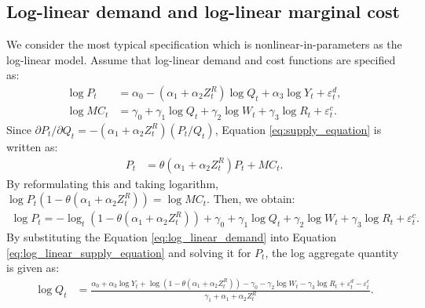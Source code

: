 \documentclass[11pt, a4paper]{article}
\begin{document}
\subsection{Log-linear demand and log-linear marginal cost}
We consider the most typical specification which is nonlinear-in-parameters as the log-linear model.
Assume that log-linear demand and cost functions are specified as:
\begin{align}
    \log P_{t} &= \alpha_0 - (\alpha_1 + \alpha_2 Z^{R}_{t}) \log Q_t + \alpha_3 \log Y_t + \varepsilon^{d}_{t},\label{eq:log_linear_demand}\\
    \log MC_t &= \gamma_0 + \gamma_1 \log Q_t +  \gamma_2 \log W_{t} + \gamma_3 \log R_t + \varepsilon^{c}_{t}.\label{eq:log_linear_marginal_cost}
\end{align}
Since $\partial P_t/\partial Q_t = - (\alpha_1 + \alpha_2 Z_{t}^R) (P_t/Q_t) $, Equation \eqref{eq:supply_equation} is written as:
\begin{align}
    P_t &= \theta (\alpha_1 + \alpha_2 Z^{R}_{t}) P_t + MC_t.\label{eq:log_linear_supply_equation_direct}
\end{align}
By reformulating this and taking logarithm, $\log P_t(1 -\theta (\alpha_1 + \alpha_2 Z^{R}_{t})) = \log MC_t.$
Then, we obtain:
\begin{align}
    \log P_t = - \log_{t}(1 - \theta(\alpha_1 + \alpha_2 Z^{R}_{t})) + \gamma_0 + \gamma_1 \log Q_t +  \gamma_2 \log W_{t} + \gamma_3 \log R_t + \varepsilon^{c}_{t}. \label{eq:log_linear_supply_equation}
\end{align}
By substituting the Equation \eqref{eq:log_linear_demand} into Equation \eqref{eq:log_linear_supply_equation} and solving it for $P_{t}$, the log aggregate quantity is given as: 
\begin{align}
    \log Q_t &= \frac{ \alpha_0 + \alpha_3 \log Y_t + \log (1 - \theta (\alpha_1 + \alpha_2 Z^{R}_{t})) - \gamma_0  -  \gamma_2 \log W_{t} - \gamma_3 \log R_t + \varepsilon^{d}_{t} - \varepsilon^{c}_{t}}{\gamma_1+ \alpha_1 + \alpha_2 Z^{R}_{t} }.\label{eq:quantity_loglinear}
\end{align}
\end{document}
